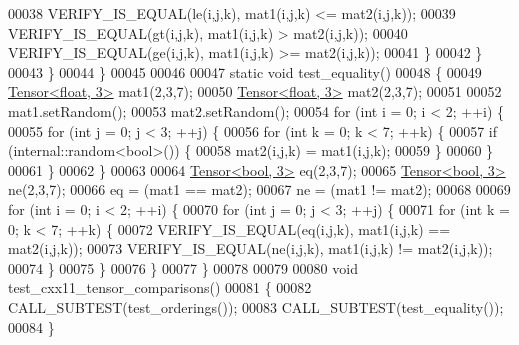 \begin{DoxyCode}
00038         VERIFY\_IS\_EQUAL(le(i,j,k), mat1(i,j,k) <= mat2(i,j,k));
00039         VERIFY\_IS\_EQUAL(gt(i,j,k), mat1(i,j,k) > mat2(i,j,k));
00040         VERIFY\_IS\_EQUAL(ge(i,j,k), mat1(i,j,k) >= mat2(i,j,k));
00041       \}
00042     \}
00043   \}
00044 \}
00045 
00046 
00047 \textcolor{keyword}{static} \textcolor{keywordtype}{void} test\_equality()
00048 \{
00049   \hyperlink{class_eigen_1_1_tensor}{Tensor<float, 3>} mat1(2,3,7);
00050   \hyperlink{class_eigen_1_1_tensor}{Tensor<float, 3>} mat2(2,3,7);
00051 
00052   mat1.setRandom();
00053   mat2.setRandom();
00054   \textcolor{keywordflow}{for} (\textcolor{keywordtype}{int} i = 0; i < 2; ++i) \{
00055     \textcolor{keywordflow}{for} (\textcolor{keywordtype}{int} j = 0; j < 3; ++j) \{
00056       \textcolor{keywordflow}{for} (\textcolor{keywordtype}{int} k = 0; k < 7; ++k) \{
00057         \textcolor{keywordflow}{if} (internal::random<bool>()) \{
00058           mat2(i,j,k) = mat1(i,j,k);
00059         \}
00060       \}
00061     \}
00062   \}
00063 
00064   \hyperlink{class_eigen_1_1_tensor}{Tensor<bool, 3>} eq(2,3,7);
00065   \hyperlink{class_eigen_1_1_tensor}{Tensor<bool, 3>} ne(2,3,7);
00066   eq = (mat1 == mat2);
00067   ne = (mat1 != mat2);
00068 
00069   \textcolor{keywordflow}{for} (\textcolor{keywordtype}{int} i = 0; i < 2; ++i) \{
00070     \textcolor{keywordflow}{for} (\textcolor{keywordtype}{int} j = 0; j < 3; ++j) \{
00071       \textcolor{keywordflow}{for} (\textcolor{keywordtype}{int} k = 0; k < 7; ++k) \{
00072         VERIFY\_IS\_EQUAL(eq(i,j,k), mat1(i,j,k) == mat2(i,j,k));
00073         VERIFY\_IS\_EQUAL(ne(i,j,k), mat1(i,j,k) != mat2(i,j,k));
00074       \}
00075     \}
00076   \}
00077 \}
00078 
00079 
00080 \textcolor{keywordtype}{void} test\_cxx11\_tensor\_comparisons()
00081 \{
00082   CALL\_SUBTEST(test\_orderings());
00083   CALL\_SUBTEST(test\_equality());
00084 \}
\end{DoxyCode}
